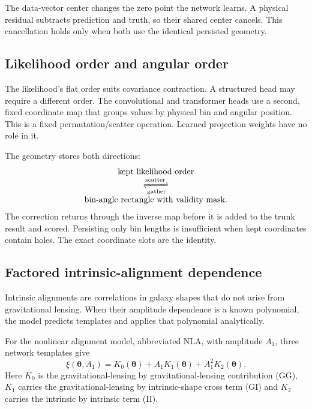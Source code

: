 \documentclass[10pt,aps,prd,twocolumn,nofootinbib]{revtex4-2}
\newcommand{\btheta}{\boldsymbol{\theta}}
\begin{document}
The data-vector center changes the zero point the network learns.  A physical
residual subtracts prediction and truth, so their shared center cancels.  This
cancellation holds only when both use the identical persisted geometry.

\subsection{Likelihood order and angular order}

The likelihood's flat order suits covariance contraction.  A structured head
may require a different order.  The convolutional and transformer heads use a
second, fixed coordinate map that groups values by physical bin and angular
position.  This is a fixed permutation/scatter operation.  Learned
projection weights have no role in it.

The geometry stores both directions:
\begin{equation*}
\begin{array}{c}
 \text{kept likelihood order}\\
 \xrightleftharpoons[\text{gather}]{\text{scatter}}\\
 \text{bin-angle rectangle with validity mask}.
\end{array}
\end{equation*}
The correction returns through the inverse map before it is added to the
trunk result and scored.  Persisting only bin lengths is insufficient when
kept coordinates contain holes.  The exact coordinate slots are the identity.

\subsection{Factored intrinsic-alignment dependence}

Intrinsic alignments are correlations in galaxy shapes that do not arise from
gravitational lensing.  When their amplitude dependence is a known
polynomial, the model predicts templates and applies that polynomial
analytically.

For the nonlinear alignment model, abbreviated NLA, with amplitude \(A_1\),
three network
templates give
\begin{equation*}
 \xi(\btheta,A_1)=K_0(\btheta)+A_1K_1(\btheta)+A_1^2K_2(\btheta).
\end{equation*}
Here \(K_0\) is the gravitational-lensing by gravitational-lensing contribution
(GG), \(K_1\) carries the gravitational-lensing by intrinsic-shape cross term
(GI) and \(K_2\) carries the intrinsic by intrinsic term (II).
\end{document}
